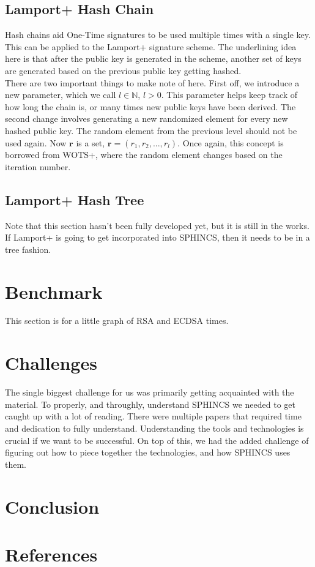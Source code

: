 \documentclass[]{scrartcl}
\begin{document}
\subsection*{Lamport+ Hash Chain}
Hash chains aid One-Time signatures to be used multiple times with a single key. This can be applied to the Lamport+ signature scheme. The underlining idea here is that after the public key is generated in the scheme, another set of keys are generated based on the previous public key getting hashed. \\
There are two important things to make note of here. First off, we introduce a new parameter, which we call $l \in \mathbb{N}$, $l > 0$. This parameter helps keep track of how long the chain is, or many times new public keys have been derived. The second change involves generating a new randomized element for every new hashed public key. The random element from the previous level should not be used again. Now $\textbf{r}$ is a set, $\textbf{r} = (r_1,r_2,...,r_l)$. Once again, this concept is borrowed from WOTS+, where the random element changes based on the iteration number.


\subsection*{Lamport+ Hash Tree}
Note that this section hasn't been fully developed yet, but it is still in the works. If Lamport+ is going to get incorporated into SPHINCS, then it needs to be in a tree fashion.


\section*{Benchmark}
This section is for a little graph of RSA and ECDSA times.

\section*{Challenges}
The single biggest challenge for us was primarily getting acquainted with the material. To properly, and throughly, understand SPHINCS we needed to get caught up with a lot of reading. There were multiple papers that required time and dedication to fully understand. Understanding the tools and technologies is crucial if we want to be successful. On top of this, we had the added challenge of figuring out how to piece together the technologies, and how SPHINCS uses them.

\section*{Conclusion}

\section*{References}
\end{document}
